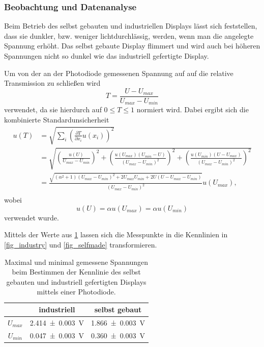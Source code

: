 \documentclass[
	a4paper,
	12pt,
	pagesize,
	ngerman
]{scrartcl}
\begin{document}
	\subsubsection{Beobachtung und Datenanalyse}
	Beim Betrieb des selbst gebauten und industriellen Displays lässt sich feststellen, dass sie dunkler, bzw. weniger lichtdurchlässig, werden, wenn man die angelegte Spannung erhöht.
	Das selbst gebaute Display flimmert und wird auch bei höheren Spannungen nicht so dunkel wie das industriell gefertigte Display.

	Um von der an der Photodiode gemessenen Spannung auf auf die relative Transmission zu schließen wird
	\begin{equation}
			T = \frac{U-U_{max}}{U_{max}-U_{min}}
	\end{equation}
	verwendet, da sie hierdurch auf $0\leq T \leq 1$ normiert wird. Dabei ergibt sich die kombinierte Standardunsicherheit
	\begin{align*}
		u(T) &= \sqrt{\sum_{i}\left(\frac{\partial T}{\partial x_i} u(x_i)\right)^2}\\
		&= \sqrt{\left(\frac{u(U)}{U_{max}-U_{min}}\right)^2+\left(\frac{u(U_{max})(U_{min}-U)}{(U_{max}-U_{min})^2}\right)^2+\left(\frac{u(U_{min})(U-U_{max})}{(U_{max}-U_{min})^2}\right)^2} \\
		&=	\frac{\sqrt{ (\alpha^2+1) (U_{max}-U_{min})^2+2U_{max}U_{min}+2U(U-U_{max}-U_{min})}}{(U_{max}-U_{min})^2} u(U_{max}), \\
	\end{align*}
	wobei
	\begin{equation*}
			u(U)=\alpha u(U_{max})=\alpha u(U_{min})
	\end{equation*}
	verwendet wurde.

	Mittels der Werte aus \cref{tb_maxmin} lassen sich die Messpunkte in die Kennlinien in \cref{fig_industry} und \cref{fig_selfmade} transformieren.
\begin{table}[H]
		\centering
		\begin{tabular}{ c | c | c }
			 & industriell & selbst gebaut \\ \hline
			$U_{max}$ & \SI{2.414+-0.003}{V} & \SI{1.866+-0.003}{V} \\
			$U_{min}$ & \SI{0.047+-0.003}{V} & \SI{0.360+-0.003}{V} \\
		\end{tabular}
		\caption{Maximal und minimal gemessene Spannungen beim Bestimmen der Kennlinie des selbst gebauten und industriell gefertigten Displays mittels einer Photodiode.}
		\label{tb_maxmin}
\end{table}
\end{document}
